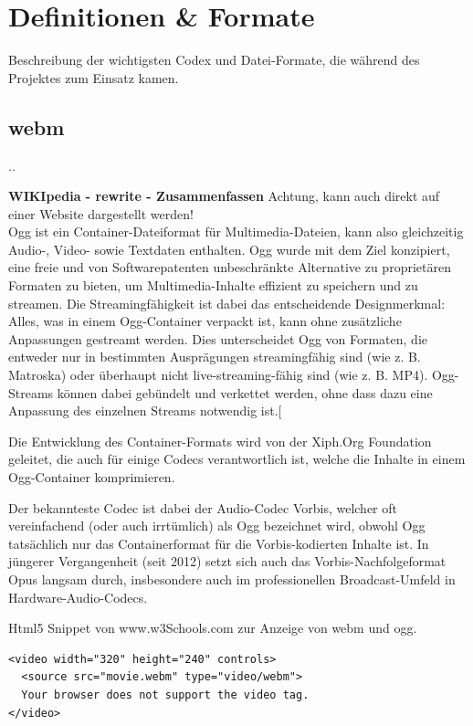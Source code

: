 \section{Definitionen \& Formate}
Beschreibung der wichtigsten Codex und Datei-Formate, die während des Projektes zum Einsatz kamen.

\subsection{webm}
\color{red}
..

\textbf{WIKIpedia - rewrite - Zusammenfassen}
Achtung, kann auch direkt auf einer Website dargestellt werden!\\

Ogg ist ein Container-Dateiformat für Multimedia-Dateien, kann also gleichzeitig Audio-, Video- sowie Textdaten enthalten. Ogg wurde mit dem Ziel konzipiert, eine freie und von Softwarepatenten unbeschränkte Alternative zu proprietären Formaten zu bieten, um Multimedia-Inhalte effizient zu speichern und zu streamen. Die Streamingfähigkeit ist dabei das entscheidende Designmerkmal: Alles, was in einem Ogg-Container verpackt ist, kann ohne zusätzliche Anpassungen gestreamt werden. Dies unterscheidet Ogg von Formaten, die entweder nur in bestimmten Ausprägungen streamingfähig sind (wie z. B. Matroska) oder überhaupt nicht live-streaming-fähig sind (wie z. B. MP4). Ogg-Streams können dabei gebündelt und verkettet werden, ohne dass dazu eine Anpassung des einzelnen Streams notwendig ist.[

Die Entwicklung des Container-Formats wird von der Xiph.Org Foundation geleitet, die auch für einige Codecs verantwortlich ist, welche die Inhalte in einem Ogg-Container komprimieren.

Der bekannteste Codec ist dabei der Audio-Codec Vorbis, welcher oft vereinfachend (oder auch irrtümlich) als Ogg bezeichnet wird, obwohl Ogg tatsächlich nur das Containerformat für die Vorbis-kodierten Inhalte ist. In jüngerer Vergangenheit (seit 2012) setzt sich auch das Vorbis-Nachfolgeformat Opus langsam durch, insbesondere auch im professionellen Broadcast-Umfeld in Hardware-Audio-Codecs. 
\color{black}

Html5 Snippet von www.w3Schools.com zur Anzeige von webm und ogg.
\begin{verbatim}
<video width="320" height="240" controls>
  <source src="movie.webm" type="video/webm">
  Your browser does not support the video tag.
</video> 
\end{verbatim}


